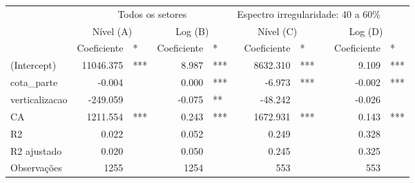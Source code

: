 \begingroup
\fontsize{10.5pt}{12.6pt}\selectfont
\begin{longtable}{lrlrlrlrl}
\toprule
 & \multicolumn{4}{c}{Todos os setores} & \multicolumn{3}{c}{Espectro irregularidade: 40 a 60\%} &  \\ 
\cmidrule(lr){2-5} \cmidrule(lr){6-8}
 & \multicolumn{2}{c}{Nível (A)    } & \multicolumn{2}{c}{Log (B)    } & \multicolumn{2}{c}{Nível (C)    } & \multicolumn{2}{c}{Log (D)    } \\ 
\cmidrule(lr){2-3} \cmidrule(lr){4-5} \cmidrule(lr){6-7} \cmidrule(lr){8-9}
  & Coeficiente & * & Coeficiente  & *  & Coeficiente   & *   & Coeficiente    & *    \\ 
\midrule\addlinespace[2.5pt]
(Intercept) & 11046.375 & *** & 8.987 & *** & 8632.310 & *** & 9.109 & *** \\ 
cota\_parte & -0.004 &  & 0.000 & *** & -6.973 & *** & -0.002 & *** \\ 
verticalizacao & -249.059 &  & -0.075 & ** & -48.242 &  & -0.026 &  \\ 
CA & 1211.554 & *** & 0.243 & *** & 1672.931 & *** & 0.143 & *** \\ 
{R2} & {0.022} & {} & {0.052} & {} & {0.249} & {} & {0.328} & {} \\ 
R2 ajustado & 0.020 &  & 0.050 &  & 0.245 &  & 0.325 &  \\ 
Observações & 1255 &  & 1254 &  & 553 &  & 553 &  \\ 
\bottomrule
\end{longtable}
\endgroup

